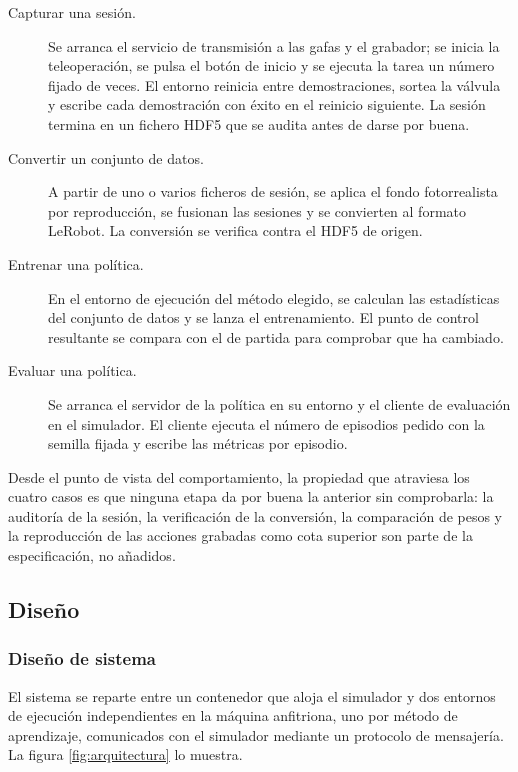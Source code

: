 \begin{description}
	\item[Capturar una sesión.] Se arranca el servicio de transmisión a las gafas y el grabador;
	se inicia la teleoperación, se pulsa el botón de inicio y se ejecuta la tarea un número fijado
	de veces. El entorno reinicia entre demostraciones, sortea la válvula y escribe cada
	demostración con éxito en el reinicio siguiente. La sesión termina en un fichero HDF5 que se
	audita antes de darse por buena.
	\item[Convertir un conjunto de datos.] A partir de uno o varios ficheros de sesión, se aplica
	el fondo fotorrealista por reproducción, se fusionan las sesiones y se convierten al formato
	LeRobot. La conversión se verifica contra el HDF5 de origen.
	\item[Entrenar una política.] En el entorno de ejecución del método elegido, se calculan las
	estadísticas del conjunto de datos y se lanza el entrenamiento. El punto de control resultante
	se compara con el de partida para comprobar que ha cambiado.
	\item[Evaluar una política.] Se arranca el servidor de la política en su entorno y el cliente
	de evaluación en el simulador. El cliente ejecuta el número de episodios pedido con la semilla
	fijada y escribe las métricas por episodio.
\end{description}

Desde el punto de vista del comportamiento, la propiedad que atraviesa los cuatro casos es que
ninguna etapa da por buena la anterior sin comprobarla: la auditoría de la sesión, la verificación
de la conversión, la comparación de pesos y la reproducción de las acciones grabadas como cota
superior son parte de la especificación, no añadidos.


\subsection{Diseño}

\subsubsection{Diseño de sistema}

El sistema se reparte entre un contenedor que aloja el simulador y dos entornos de ejecución
independientes en la máquina anfitriona, uno por método de aprendizaje, comunicados con el simulador
mediante un protocolo de mensajería. La figura \ref{fig:arquitectura} lo muestra.

